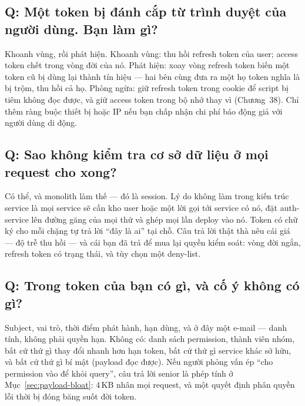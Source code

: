 \subsection*{Q: Một token bị đánh cắp từ trình duyệt của người dùng. Bạn làm gì?}

Khoanh vùng, rồi phát hiện. Khoanh vùng: thu hồi refresh token của
user; access token chết trong vòng đời của nó. Phát hiện: xoay vòng
refresh token biến một token cũ bị dùng lại thành tín hiệu --- hai bên
cùng đưa ra một họ token nghĩa là bị trộm, thu hồi cả họ. Phòng ngừa:
giữ refresh token trong cookie  để script bị tiêm không
đọc được, và giữ access token trong bộ nhớ thay vì
 (Chương~38). Chỉ thêm ràng buộc thiết bị hoặc IP
nếu bạn chấp nhận chi phí báo động giả với người dùng di động.

\subsection*{Q: Sao không kiểm tra cơ sở dữ liệu ở mọi request cho xong?}

Có thể, và monolith làm thế --- đó là session. Lý do không làm trong
kiến trúc service là mọi service sẽ cần kho user hoặc một lời gọi tới
service có nó, đặt auth-service lên đường găng của mọi thứ và ghép mọi
lần deploy vào nó. Token có chữ ký cho mỗi chặng tự trả lời ``đây là
ai'' tại chỗ. Câu trả lời thật thà nêu cái giá --- độ trễ thu hồi ---
và cái bạn đã trả để mua lại quyền kiểm soát: vòng đời ngắn, refresh
token có trạng thái, và tùy chọn một deny-list.

\subsection*{Q: Trong token của bạn có gì, và cố ý không có gì?}

Subject, vai trò, thời điểm phát hành, hạn dùng, và ở đây một e-mail
--- danh tính, không phải quyền hạn. Không có: danh sách permission,
thành viên nhóm, bất cứ thứ gì thay đổi nhanh hơn hạn token, bất cứ thứ
gì service khác sở hữu, và bất cứ thứ gì bí mật (payload đọc được). Nếu
người phỏng vấn ép ``cho permission vào để khỏi query'', câu trả lời
senior là phép tính ở Mục~\ref{sec:payload-bloat}: 4\,KB nhân mọi
request, và một quyết định phân quyền lỗi thời bị đóng băng suốt đời
token.

